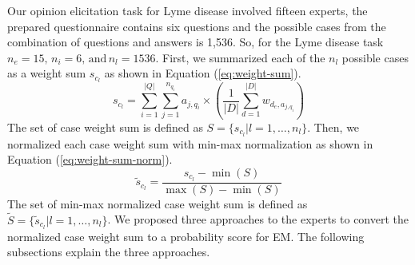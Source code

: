 Our opinion elicitation task for Lyme disease involved fifteen experts, the prepared questionnaire contains six questions and the possible cases from the combination of questions and answers is 1,536. So, for the Lyme disease task  $n_e=15,\, n_i=6,\,\text{and}\,n_l=1536$. First, we summarized each of the $n_l$ possible cases as a weight sum $s_{c_{l}}$ as shown in Equation (\ref{eq:weight-sum}).
\begin{equation}\label{eq:weight-sum}
	s_{c_{l}} = \sum_{i = 1}^{\vert Q\vert }\sum_{j = 1}^{n_{q_{i}}}a_{j,q_{i}}\times\left(\frac{1}{\vert D\vert }\sum_{d = 1}^{\vert D\vert }w_{d_{e},a_{j,q_{i}}}\right)
\end{equation}
The set of case weight sum is defined as \( S = \{s_{c_{l}}\vert l = 1,\ldots ,n_l\}\). Then, we normalized each case weight sum with min-max normalization as shown in Equation (\ref{eq:weight-sum-norm}).
\begin{equation}\label{eq:weight-sum-norm}
	\tilde{s}_{c_l}=\frac{s_{c_l}-\min (S)}{\max (S)-\min (S)}
\end{equation}
The set of min-max normalized case weight sum is defined as \(\tilde{S} = \{\tilde{s}_{c_{l}}\vert l = 1,\ldots ,n_l\}\). We proposed three approaches to the experts to convert the normalized case weight sum to a probability score for EM. The following subsections explain the three approaches.

